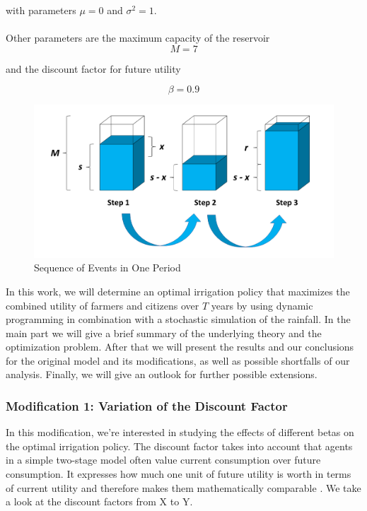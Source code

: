 \documentclass[12pt, a4paper, oneside]{article}
\begin{document}
with parameters $\mu = 0$ and $\sigma^2 = 1$.\\\\

Other parameters are the maximum capacity of the reservoir
\begin{equation}
	M = 7
\end{equation}

and the discount factor for future utility 

\begin{equation}
	\beta = 0.9
\end{equation}

\begin{figure}[ht]
	\includegraphics[width=1\textwidth]{figures/CESchaubild_Cut.png}
	\caption{Sequence of Events in One Period}
	\label{fig:Sequence}
\end{figure}

In this work, we will determine an optimal irrigation policy that maximizes the combined utility of farmers and citizens over $T$ years by using dynamic programming in combination with a stochastic simulation of the rainfall. 
In the main part we will give a brief summary of the underlying theory and the optimization problem. 
After that we will present the results and our conclusions for the original model and its modifications, as well as possible shortfalls of our analysis. %
Finally, we will give an outlook for further possible extensions.


\subsubsection{Modification 1: Variation of the Discount Factor}
In this modification, we're interested in studying the effects of different betas on the optimal irrigation policy. 
The discount factor takes into account that agents in a simple two-stage model often value current consumption over future consumption.
It expresses how much one unit of future utility is worth in terms of current utility and therefore makes them mathematically comparable \citep{kruschwitz2014investitionsrechnung}. %
We take a look at the discount factors from X to Y. %
\end{document}
